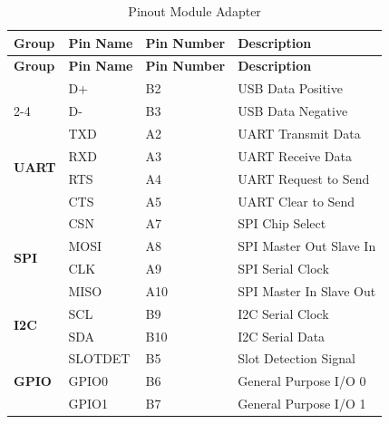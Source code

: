            \begin{longtable}{|l|l|p{6.5cm}|p{4.5cm}|}
                \caption{Pinout Module Adapter}
                \label{tab:new_module_adapter_pinout} \\
                \hline
                \textbf{Group} & \textbf{Pin Name} & \textbf{Pin Number} & \textbf{Description} \\ \hline
                \endfirsthead

                \hline
                \textbf{Group} & \textbf{Pin Name} & \textbf{Pin Number} & \textbf{Description} \\ \hline
                \endhead

                \hline
                \endfoot

                \hline
                \endlastfoot

                \multirow{2}{*}{\textbf{USB}}
                    & D+   & B2 & USB Data Positive \\ \cline{2-4}
                    & D-   & B3 & USB Data Negative \\ \hline

                \multirow{4}{*}{\textbf{UART}}
                    & TXD  & A2 & UART Transmit Data \\ \cline{2-4}
                    & RXD  & A3 & UART Receive Data \\ \cline{2-4}
                    & RTS  & A4 & UART Request to Send \\ \cline{2-4}
                    & CTS  & A5 & UART Clear to Send \\ \hline

                \multirow{4}{*}{\textbf{SPI}}
                    & CSN  & A7  & SPI Chip Select \\ \cline{2-4}
                    & MOSI & A8  & SPI Master Out Slave In \\ \cline{2-4}
                    & CLK  & A9  & SPI Serial Clock \\ \cline{2-4}
                    & MISO & A10 & SPI Master In Slave Out \\ \hline

                \multirow{2}{*}{\textbf{I2C}}
                    & SCL  & B9  & I2C Serial Clock \\ \cline{2-4}
                    & SDA  & B10 & I2C Serial Data \\ \hline

                \multirow{3}{*}{\textbf{GPIO}}
                    & SLOTDET & B5 & Slot Detection Signal \\ \cline{2-4}
                    & GPIO0   & B6 & General Purpose I/O 0 \\ \cline{2-4}
                    & GPIO1   & B7 & General Purpose I/O 1 \\ \hline


\end{longtable}
